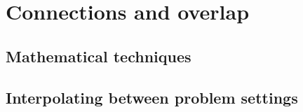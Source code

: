 \section{Connections and overlap}

\subsection{Mathematical techniques}
\subsection{Interpolating between problem settings}